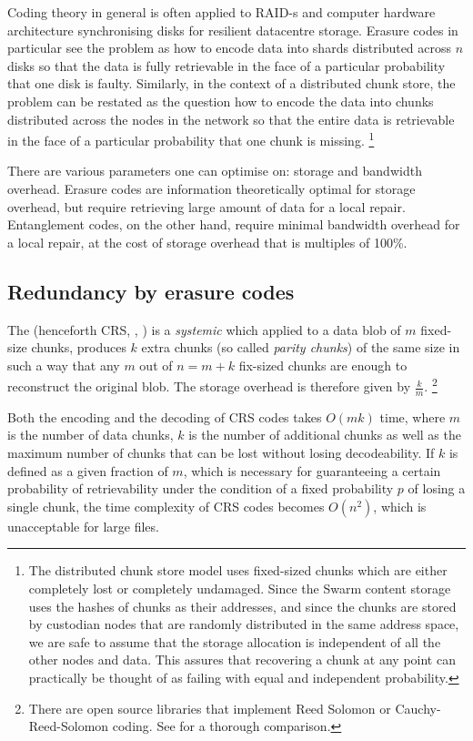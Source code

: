Coding theory in general is often applied to RAID-s and computer hardware architecture synchronising disks for resilient datacentre storage.
Erasure codes in particular see the problem as how to encode data into shards distributed across $n$ disks so that the data is fully retrievable in the face of a particular probability that one disk is faulty.
Similarly, in the context of a distributed chunk store, the problem can be restated as the question how to encode the data into chunks distributed across the nodes in the network so that the entire data is retrievable in the face of a particular probability that one chunk is missing.%
%
\footnote{The distributed chunk store model uses fixed-sized chunks which are either completely lost or completely undamaged. Since the Swarm content storage uses the hashes of chunks as their addresses, and since the chunks are stored by custodian nodes that are randomly distributed in the same address space, we are safe to assume that the storage allocation is independent of all the other nodes and data. This assures that recovering a chunk at any point can practically be thought of as failing with equal and independent probability.}

There are various parameters one can optimise on: storage and bandwidth overhead. Erasure codes are information theoretically optimal for storage overhead, but require retrieving large amount of data for a local repair.
Entanglement codes, on the other hand, require minimal bandwidth overhead for a local repair, at the cost of storage overhead that is multiples of 100\%. 

\subsection{Redundancy by erasure codes}\label{sec:erasure}


The  (henceforth CRS, \cite{lubyetal1995CRS}, \cite{plank2006optimizing}) is a \emph{systemic}  which applied to a data blob of $m$ fixed-size chunks, produces $k$ extra chunks (so called \emph{parity chunks}) of the same size in such a way that any $m$ out of $n=m+k$ fix-sized chunks are enough to reconstruct the original blob. The storage overhead is therefore given by $\frac{k}{m}$.%
%
\footnote{%
There are open source libraries that implement Reed Solomon or Cauchy-Reed-Solomon coding. See \cite{plank2009performance} for a thorough comparison.}

Both the encoding and the decoding of CRS codes takes $O(mk)$ time, where $m$ is the number of data chunks, $k$ is the number of additional chunks as well as the maximum number of chunks that can be lost without losing decodeability. If $k$ is defined as a given fraction of $m$, which is necessary for guaranteeing a certain probability of retrievability under the condition of a fixed probability $p$ of losing a single chunk, the time complexity of CRS codes becomes $O(n^2)$, which is unacceptable for large files. 

